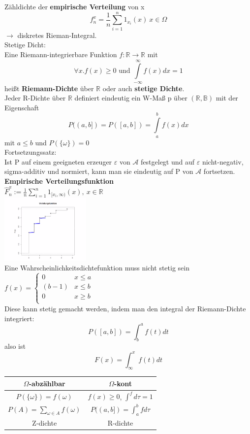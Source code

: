 \documentclass{article}
\begin{document}
	Zähldichte der \textbf{empirische Verteilung} von x\\
	\[f_n^x = \frac{1}{n} \sum\limits^n_{i=1} 1_{x_i}(x)\ x\in\Omega\]
	$\to$ diskretes Rieman-Integral.\\
	Stetige Dicht:\\
	Eine Riemann-integrierbare Funktion $f:\mathbb{R}\to\mathbb{R}$ mit\\
	\[\forall x.f(x)\geq 0\text{ und }\int\limits^\infty_{-\infty} f(x)dx =1\]
	heißt \textbf{Riemann-Dichte} über $\mathbb{R}$ oder auch \textbf{stetige Dichte}.\\
	Jeder R-Dichte über $\mathbb{R}$ definiert eindeutig ein W-Maß p über $(\mathbb{R},\mathbb{B})$ mit der Eigenschaft
	\[P((a,b])=P([a,b])=\int\limits^b_a f(x)dx\]
	mit $a\leq b$ und $P(\{\omega\})=0$\\
	Fortsetzungssatz:\\
	Ist P auf einem geeigneten erzeuger $\varepsilon$ von $\mathcal{A}$ festgelegt und auf $\varepsilon$ nicht-negativ, sigma-additiv und normiert, kann man sie eindeutig auf P von $\mathcal{A}$ fortsetzen.\\
	\textbf{Empirische Verteilungsfunktion}\\
	$\hat F^x_n:= \frac{1}{n} \sum\limits^n_{i=1} 1_{[x_i,\infty)} (x),\ x\in\mathbb{R}$\\
	\includegraphics[height=128px]{verteilungsfunktion.png}\\
	Eine Wahrscheinlichkeitsdichtefunktion muss nicht stetig sein $f(x)=\begin{cases}0&x\leq a\\ (b-1)&x\leq b\\0&x\geq b\\\end{cases}$\\
	Diese kann stetig gemacht werden, indem man den integral der Riemann-Dichte integriert:\\
	\[P([a,b])=\int^a_b f(t)dt\]
	also ist 
	\[F(x)=\int^x_{\infty} f(t) dt\]
	\begin{tabular}{|c|c|}\hline
	$\Omega$-abzählbar&$\Omega$-kont\\\hline
	$P(\{\omega\})=f(\omega)$& $f(x)\geq 0$, $\int^fd\tau=1$\\
	$P(A)=\sum_{\omega\in A}f(\omega)$&$P((a,b])=\int^b_afd\tau$\\
	Z-dichte&R-dichte\\\hline
	\end{tabular}\\
\end{document}

